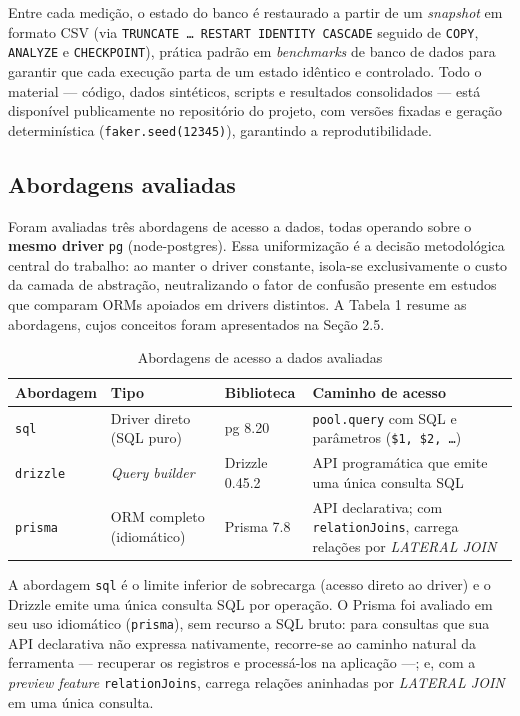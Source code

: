 \documentclass[12pt]{article}
\begin{document}
Entre cada medição, o estado do banco é restaurado a partir de um
\textit{snapshot} em formato CSV (via \texttt{TRUNCATE \ldots{} RESTART
IDENTITY CASCADE} seguido de \texttt{COPY}, \texttt{ANALYZE} e
\texttt{CHECKPOINT}), prática padrão em \textit{benchmarks} de banco de
dados para garantir que cada execução parta de um estado idêntico e
controlado. Todo o material --- código, dados sintéticos, scripts e
resultados consolidados --- está disponível publicamente no repositório
do projeto, com versões fixadas e geração determinística
(\texttt{faker.seed(12345)}), garantindo a reprodutibilidade.

\subsection{Abordagens avaliadas}

Foram avaliadas três abordagens de acesso a dados, todas operando sobre o
\textbf{mesmo driver} \texttt{pg} (node-postgres). Essa uniformização é a
decisão metodológica central do trabalho: ao manter o driver constante,
isola-se exclusivamente o custo da camada de abstração, neutralizando o
fator de confusão presente em estudos que comparam ORMs apoiados em
drivers distintos. A Tabela 1 resume as abordagens, cujos conceitos foram
apresentados na Seção 2.5.

\begin{table}[!htb]
\centering
\caption{Abordagens de acesso a dados avaliadas}
\label{tab:abordagens}
\scriptsize
\begin{tabular}{@{}p{2.0cm}p{2.0cm}p{1.7cm}p{6.0cm}@{}}
\toprule
Abordagem & Tipo & Biblioteca & Caminho de acesso \\
\midrule
\texttt{sql} & Driver direto (SQL puro) & pg 8.20 & \texttt{pool.query} com SQL e parâmetros (\texttt{\$1, \$2, \ldots}) \\
\texttt{drizzle} & \textit{Query builder} & Drizzle 0.45.2 & API programática que emite uma única consulta SQL \\
\texttt{prisma} & ORM completo (idiomático) & Prisma 7.8 & API declarativa; com \texttt{relationJoins}, carrega relações por \textit{LATERAL JOIN} \\
\bottomrule
\end{tabular}

\vspace{2pt}{\footnotesize Fonte: elaboração própria.}
\end{table}

A abordagem \texttt{sql} é o limite inferior de sobrecarga (acesso direto
ao driver) e o Drizzle emite uma única consulta SQL por operação. O Prisma
foi avaliado em seu uso idiomático (\texttt{prisma}), sem recurso a SQL
bruto: para consultas que sua API declarativa não expressa nativamente,
recorre-se ao caminho natural da ferramenta --- recuperar os registros e
processá-los na aplicação ---; e, com a \textit{preview feature}
\texttt{relationJoins}, carrega relações aninhadas por \textit{LATERAL
JOIN} em uma única consulta.
\end{document}
